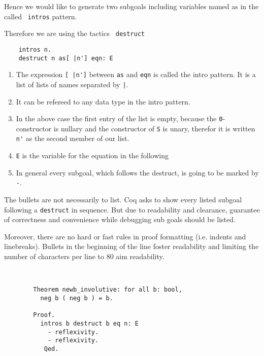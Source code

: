     Hence we would like to generate two subgoals including variables named as in the called \lstinline! intros! pattern.	   
        
    Therefore we are using the tactics \lstinline! destruct!	
	\begin{lstlisting}
	intros n.
	destruct n as[ |n'] eqn: E
	\end{lstlisting}
	
	\begin{enumerate}
		\item The expression \lstinline![ |n']! between \lstinline!as! and \lstinline!eqn! is called the intro pattern. It is a list of lists of names separated by \lstinline!|!.
		\item It can be refereed to any data type in the intro pattern.
		\item In the above case the first entry of the list is empty, because the \lstinline!0!-constructor is nullary and the constructor of \lstinline!S! is unary, therefor it is written \lstinline!n'! as the second member of our list.
		\item \lstinline!E! is the variable for the equation in the following
		\item In general every subgoal, which follows the destruct, is going to be marked by \lstinline!-!.
	\end{enumerate} 
	
	The bullets are not necessarily to list. 
	Coq asks to show every listed subgoal following a \lstinline!destruct! in sequence.
	But due to readability and clearance, guarantee of correctness and convenience while debugging sub goals should be listed.
	
	Moreover, there are no hard or fast rules in proof formatting (i.e. indents and linebreaks). 
	Bullets in the beginning of the line foster readability and limiting the number of characters per line to 80 aim readability.
	
	\begin{example} ~\\\vspace{-10mm}
	  \begin{lstlisting}
	  	Theorem newb_involutive: for all b: bool,
	  	  neg b ( neg b ) = b.
	  	  
	  	Proof. 
	  	  intros b destruct b eq n: E
	  	    - reflexivity. 
	  	    - reflexivity. 
	  	   Qed.  
	  \end{lstlisting}
	\end{example}
	 

